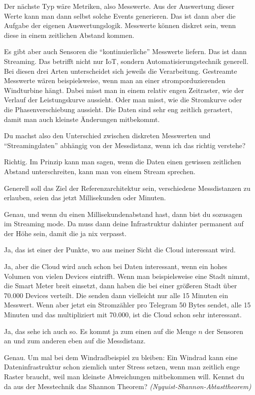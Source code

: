 Der nächste Typ wäre Metriken, also Messwerte. Aus der Auswertung dieser Werte kann man dann selbst solche Events generieren. Das ist dann aber die Aufgabe der eigenen Auswertungslogik. Messwerte können diskret sein, wenn diese in einem zeitlichen Abstand kommen. 

Es gibt aber auch Sensoren die \enquote{kontinuierliche} Messwerte liefern. Das ist dann Streaming.  Das betrifft nicht nur \ac{IoT}, sondern Automatisierungstechnik generell. Bei diesen drei Arten unterscheidet sich jeweils die Verarbeitung. Gestreamte Messwerte wären beispielsweise, wenn man an einer stromporduzierenden Windturbine hängt. Dabei misst man in einem relativ engen Zeitraster, wie der Verlauf der Leistungskurve aussieht. Oder man misst, wie die Stromkurve oder die Phasenverschiebung aussieht. Die Daten sind sehr eng zeitlich gerastert, damit man auch kleinste Änderungen mitbekommt. 

\LF Du machst also den Unterschied zwischen diskreten Messwerten und \enquote{Streamingdaten} abhängig von der Messdistanz, wenn ich das richtig verstehe?

\PE Richtig. Im Prinzip kann man sagen, wenn die Daten einen gewissen zeitlichen Abstand unterschreiten, kann man von einem Stream sprechen. 

\LF Generell soll das Ziel der Referenzarchitektur sein, verschiedene Messdistanzen zu erlauben, seien das jetzt Millisekunden oder Minuten.

\PE Genau, und wenn du einen Millisekundenabstand hast, dann bist du sozusagen im Streaming mode. Da muss dann deine Infrastruktur dahinter permanent auf der Höhe sein, damit die ja nix verpasst. 

\LF Ja, das ist einer der Punkte, wo aus meiner Sicht die Cloud interessant wird.

\PE Ja, aber die Cloud wird auch schon bei Daten interessant, wenn ein hohes Volumen von vielen Devices eintrifft. Wenn man beispielsweise eine Stadt nimmt, die Smart Meter breit einsetzt, dann haben die bei einer größeren Stadt über 70.000 Devices verteilt. Die senden dann vielleicht nur alle 15 Minuten ein Messwert. Wenn aber jetzt ein Stromzähler pro Telegram 50 Bytes sendet, alle 15 Minuten und das multipliziert mit 70.000, ist die Cloud schon sehr interessant.

\LF Ja, das sehe ich auch so. Es kommt ja zum einen auf die Menge $n$ der Sensoren an und zum anderen eben auf die Messdistanz.

\PE Genau. Um mal bei dem Windradbeispiel zu bleiben: Ein Windrad kann eine Dateninfrastruktur schon ziemlich unter Stress setzen, wenn man zeitlich enge Raster braucht, weil man kleinste Abweichungen mitbekommen will. Kennst du da aus der Messtechnik das Shannon Theorem? \textit{(Nyquist-Shannon-Abtasttheorem)}

